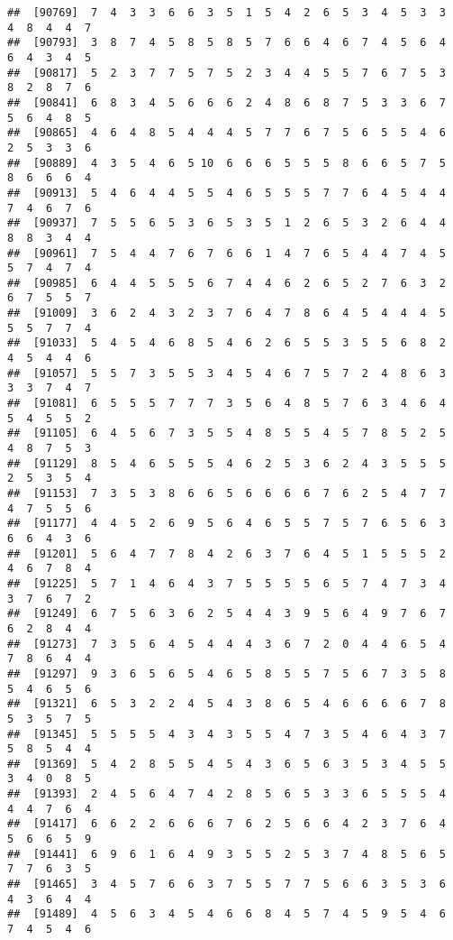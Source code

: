 \documentclass[
]{book}
\begin{document}
\begin{verbatim}
##  [90769]  7  4  3  3  6  6  3  5  1  5  4  2  6  5  3  4  5  3  3  4  8  4  4  7
##  [90793]  3  8  7  4  5  8  5  8  5  7  6  6  4  6  7  4  5  6  4  6  4  3  4  5
##  [90817]  5  2  3  7  7  5  7  5  2  3  4  4  5  5  7  6  7  5  3  8  2  8  7  6
##  [90841]  6  8  3  4  5  6  6  6  2  4  8  6  8  7  5  3  3  6  7  5  6  4  8  5
##  [90865]  4  6  4  8  5  4  4  4  5  7  7  6  7  5  6  5  5  4  6  2  5  3  3  6
##  [90889]  4  3  5  4  6  5 10  6  6  6  5  5  5  8  6  6  5  7  5  8  6  6  6  4
##  [90913]  5  4  6  4  4  5  5  4  6  5  5  5  7  7  6  4  5  4  4  7  4  6  7  6
##  [90937]  7  5  5  6  5  3  6  5  3  5  1  2  6  5  3  2  6  4  4  8  8  3  4  4
##  [90961]  7  5  4  4  7  6  7  6  6  1  4  7  6  5  4  4  7  4  5  5  7  4  7  4
##  [90985]  6  4  4  5  5  5  6  7  4  4  6  2  6  5  2  7  6  3  2  6  7  5  5  7
##  [91009]  3  6  2  4  3  2  3  7  6  4  7  8  6  4  5  4  4  4  5  5  5  7  7  4
##  [91033]  5  4  5  4  6  8  5  4  6  2  6  5  5  3  5  5  6  8  2  4  5  4  4  6
##  [91057]  5  5  7  3  5  5  3  4  5  4  6  7  5  7  2  4  8  6  3  3  3  7  4  7
##  [91081]  6  5  5  5  7  7  7  3  5  6  4  8  5  7  6  3  4  6  4  5  4  5  5  2
##  [91105]  6  4  5  6  7  3  5  5  4  8  5  5  4  5  7  8  5  2  5  4  8  7  5  3
##  [91129]  8  5  4  6  5  5  5  4  6  2  5  3  6  2  4  3  5  5  5  2  5  3  5  4
##  [91153]  7  3  5  3  8  6  6  5  6  6  6  6  7  6  2  5  4  7  7  4  7  5  5  6
##  [91177]  4  4  5  2  6  9  5  6  4  6  5  5  7  5  7  6  5  6  3  6  6  4  3  6
##  [91201]  5  6  4  7  7  8  4  2  6  3  7  6  4  5  1  5  5  5  2  4  6  7  8  4
##  [91225]  5  7  1  4  6  4  3  7  5  5  5  5  6  5  7  4  7  3  4  3  7  6  7  2
##  [91249]  6  7  5  6  3  6  2  5  4  4  3  9  5  6  4  9  7  6  7  6  2  8  4  4
##  [91273]  7  3  5  6  4  5  4  4  4  3  6  7  2  0  4  4  6  5  4  7  8  6  4  4
##  [91297]  9  3  6  5  6  5  4  6  5  8  5  5  7  5  6  7  3  5  8  5  4  6  5  6
##  [91321]  6  5  3  2  2  4  5  4  3  8  6  5  4  6  6  6  6  7  8  5  3  5  7  5
##  [91345]  5  5  5  5  4  3  4  3  5  5  4  7  3  5  4  6  4  3  7  5  8  5  4  4
##  [91369]  5  4  2  8  5  5  4  5  4  3  6  5  6  3  5  3  4  5  5  3  4  0  8  5
##  [91393]  2  4  5  6  4  7  4  2  8  5  6  5  3  3  6  5  5  5  4  4  4  7  6  4
##  [91417]  6  6  2  2  6  6  6  7  6  2  5  6  6  4  2  3  7  6  4  5  6  6  5  9
##  [91441]  6  9  6  1  6  4  9  3  5  5  2  5  3  7  4  8  5  6  5  7  7  6  3  5
##  [91465]  3  4  5  7  6  6  3  7  5  5  7  7  5  6  6  3  5  3  6  4  3  6  4  4
##  [91489]  4  5  6  3  4  5  4  6  6  8  4  5  7  4  5  9  5  4  6  7  4  5  4  6

\end{verbatim}
\end{document}
